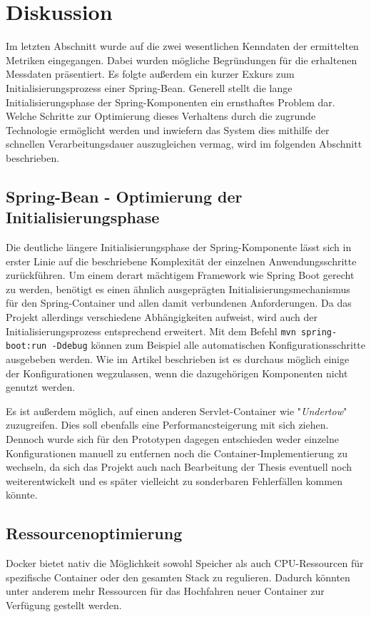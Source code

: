 \section{Diskussion}
Im letzten Abschnitt wurde auf die zwei wesentlichen Kenndaten der ermittelten Metriken eingegangen. Dabei wurden mögliche Begründungen für die erhaltenen Messdaten präsentiert. Es folgte außerdem ein kurzer Exkurs zum Initialisierungsprozess einer Spring-Bean. Generell stellt die lange Initialisierungsphase der Spring-Komponenten ein ernsthaftes Problem dar. Welche Schritte zur Optimierung dieses Verhaltens durch die zugrunde Technologie ermöglicht werden und inwiefern das System dies mithilfe der schnellen Verarbeitungsdauer auszugleichen vermag, wird im folgenden Abschnitt beschrieben. 

\subsection{Spring-Bean - Optimierung der Initialisierungsphase}
\label{ss:spring-perf}

Die deutliche längere Initialisierungsphase der Spring-Komponente lässt sich in erster Linie auf die beschriebene Komplexität der einzelnen Anwendungsschritte zurückführen. Um einem derart mächtigem Framework wie Spring Boot gerecht zu werden, benötigt es einen ähnlich ausgeprägten Initialisierungsmechanismus für den Spring-Container und allen damit verbundenen Anforderungen. Da das Projekt allerdings verschiedene Abhängigkeiten aufweist, wird auch der Initialisierungsprozess entsprechend erweitert. Mit dem Befehl \verb+mvn spring-boot:run -Ddebug+ können zum Beispiel alle automatischen Konfigurationsschritte ausgebeben werden. Wie im Artikel \cite{spring-perf} beschrieben ist es durchaus möglich einige der Konfigurationen wegzulassen, wenn die dazugehörigen Komponenten nicht genutzt werden. 

Es ist außerdem möglich, auf einen anderen Servlet-Container wie "\emph{Undertow}" zuzugreifen. Dies soll ebenfalls eine Performancsteigerung mit sich ziehen. Dennoch wurde sich für den Prototypen dagegen entschieden weder einzelne Konfigurationen manuell zu entfernen noch die Container-Implementierung zu wechseln, da sich das Projekt auch nach Bearbeitung der Thesis eventuell noch weiterentwickelt und es später vielleicht zu sonderbaren Fehlerfällen kommen könnte.


\subsection{Ressourcenoptimierung}
\label{par:resOpt}
Docker bietet nativ die Möglichkeit sowohl Speicher als auch CPU-Ressourcen für spezifische Container oder den gesamten Stack zu regulieren. Dadurch könnten unter anderem mehr Ressourcen für das Hochfahren neuer Container zur Verfügung gestellt werden.

